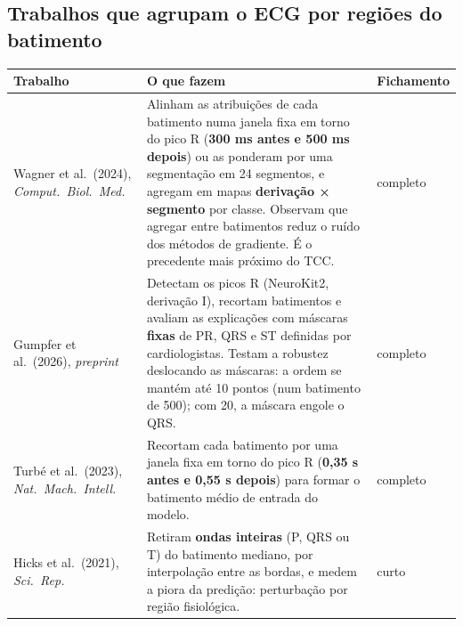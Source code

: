 \documentclass[11pt,a4paper]{article}
\begin{document}
\subsection{Trabalhos que agrupam o ECG por regiões do batimento}
\begin{center}\small
\begin{tabularx}{\linewidth}{>{\raggedright\arraybackslash}p{2.5cm}X>{\raggedright\arraybackslash}p{2.1cm}}
\toprule
\textbf{Trabalho} & \textbf{O que fazem} & \textbf{Fichamento} \\
\midrule
Wagner et al.\ (2024), \textit{Comput.\ Biol.\ Med.} & Alinham as atribuições de cada batimento numa janela fixa em torno do pico R (\textbf{300 ms antes e 500 ms depois}) ou as ponderam por uma segmentação em 24 segmentos, e agregam em mapas \textbf{derivação × segmento} por classe. Observam que agregar entre batimentos reduz o ruído dos métodos de gradiente. É o precedente mais próximo do TCC. & completo \\ \addlinespace
Gumpfer et al.\ (2026), \textit{preprint} & Detectam os picos R (NeuroKit2, derivação I), recortam batimentos e avaliam as explicações com máscaras \textbf{fixas} de PR, QRS e ST definidas por cardiologistas. Testam a robustez deslocando as máscaras: a ordem se mantém até 10 pontos (num batimento de 500); com 20, a máscara engole o QRS. & completo \\ \addlinespace
Turbé et al.\ (2023), \textit{Nat.\ Mach.\ Intell.} & Recortam cada batimento por uma janela fixa em torno do pico R (\textbf{0,35 s antes e 0,55 s depois}) para formar o batimento médio de entrada do modelo. & completo \\ \addlinespace
Hicks et al.\ (2021), \textit{Sci.\ Rep.} & Retiram \textbf{ondas inteiras} (P, QRS ou T) do batimento mediano, por interpolação entre as bordas, e medem a piora da predição: perturbação por região fisiológica. & curto \\
\bottomrule
\end{tabularx}
\end{center}
\end{document}
